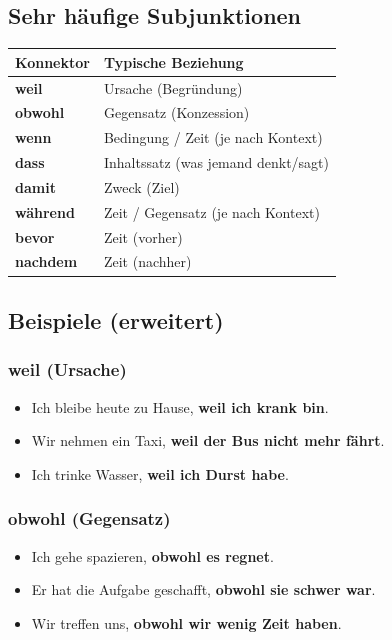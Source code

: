 \documentclass[a4paper,12pt]{article}
\begin{document}
        \subsection{Sehr h\"aufige Subjunktionen}
            \begin{longtable}{@{}ll@{}}
                \toprule
                Konnektor & Typische Beziehung \\
                \midrule
                \endhead
                \textbf{weil} & Ursache (Begründung) \\
                \textbf{obwohl} & Gegensatz (Konzession) \\
                \textbf{wenn} & Bedingung / Zeit (je nach Kontext) \\
                \textbf{dass} & Inhaltssatz (was jemand denkt/sagt) \\
                \textbf{damit} & Zweck (Ziel) \\
                \textbf{w\"ahrend} & Zeit / Gegensatz (je nach Kontext) \\
                \textbf{bevor} & Zeit (vorher) \\
                \textbf{nachdem} & Zeit (nachher) \\
                \bottomrule
            \end{longtable}
        
        \subsection{Beispiele (erweitert)}
            
            \subsubsection{weil (Ursache)}
            \begin{itemize}[leftmargin=2em]
					\item Ich bleibe heute zu Hause, \textbf{weil ich krank bin}.
                    \item Wir nehmen ein Taxi, \textbf{weil der Bus nicht mehr f\"ahrt}.
                    \item Ich trinke Wasser, \textbf{weil ich Durst habe}.
                \end{itemize}
            
            \subsubsection{obwohl (Gegensatz)}
            \begin{itemize}[leftmargin=2em]
					\item Ich gehe spazieren, \textbf{obwohl es regnet}.
                    \item Er hat die Aufgabe geschafft, \textbf{obwohl sie schwer war}.
                    \item Wir treffen uns, \textbf{obwohl wir wenig Zeit haben}.
                \end{itemize}
            
\end{document}
